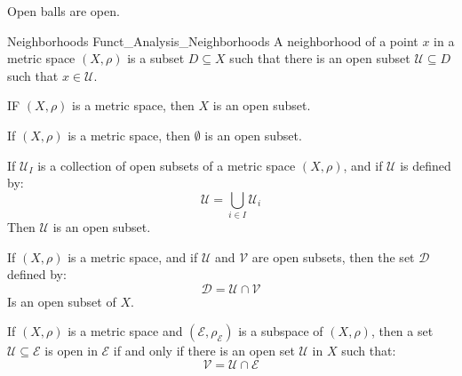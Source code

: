 \documentclass[crop=false,class=book,oneside]{standalone}                      %
\begin{document}
            \begin{theorem}
                Open balls are open.
            \end{theorem}
            \begin{ldefinition}{Neighborhoods}
                  {Funct_Analysis_Neighborhoods}
                A neighborhood of a point $x$ in a metric space
                $(X,\rho)$ is a subset $D\subseteq{X}$ such
                that there is an open subset
                $\mathcal{U}\subseteq{D}$ such that
                $x\in\mathcal{U}$.
            \end{ldefinition}
            \begin{theorem}
                IF $(X,\rho)$ is a metric space, then $X$ is
                an open subset.
            \end{theorem}
            \begin{theorem}
                If $(X,\rho)$ is a metric space, then
                $\emptyset$ is an open subset.
            \end{theorem}
            \begin{theorem}
                If $\mathcal{U}_{I}$ is a collection of open subsets
                of a metric space $(X,\rho)$, and if
                $\mathcal{U}$ is defined by:
                \begin{equation}
                    \mathcal{U}=\bigcup_{i\in{I}}\mathcal{U}_{i}
                \end{equation}
                Then $\mathcal{U}$ is an open subset.
            \end{theorem}
            \begin{theorem}
                If $(X,\rho)$ is a metric space, and if
                $\mathcal{U}$ and $\mathcal{V}$ are open
                subsets, then the set $\mathcal{D}$ defined by:
                \begin{equation}
                    \mathcal{D}=\mathcal{U}\cap\mathcal{V}
                \end{equation}
                Is an open subset of $X$.
            \end{theorem}
            \begin{theorem}
                If $(X,\rho)$ is a metric space and
                $(\mathcal{E},\rho_{\mathcal{E}})$ is a subspace
                of $(X,\rho)$, then a set
                $\mathcal{U}\subseteq\mathcal{E}$
                is open in $\mathcal{E}$ if and only if there is
                an open set $\mathcal{U}$ in $X$ such that:
                \begin{equation}
                    \mathcal{V}=\mathcal{U}\cap\mathcal{E}
                \end{equation}
            \end{theorem}
\end{document}
